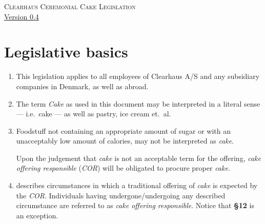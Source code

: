 \documentclass[a4paper, oneside, article]{memoir}
\newcounter{tbc}
\begin{document}
\thispagestyle{empty} %
\begin{center}
  \textsc{\huge Clearhaus Ceremonial Cake Legislation}
  \\
  {\footnotesize \href{https://semver.org/}{Version 0.4}}
\end{center}

\chapter{Legislative basics}

\begin{enumerate}[§ 1]
  \item This legislation applies to all employees of Clearhaus {\small A/S} and
    any subsidiary companies in Denmark, as well as abroad.

  \item The term \emph{Cake} as used in this document may be
    interpreted in a literal sense --- i.e.\ cake --- as well as pastry, ice
    cream et.\ al.

  \item Foodstuff not containing an appropriate amount of sugar or with an
    unacceptably low amount of calories, may not be interpreted as
    \emph{cake}.

    Upon the judgement that \emph{cake} is not an acceptable term for the
    offering, \emph{cake offering responsible} (\emph{COR}) will be obligated to 
    procure proper \emph{cake}.

  \item {} describes circumstances in which a traditional
    offering of \emph{cake} is expected by the \emph{COR}.  Individuals having 
    undergone/undergoing any described circumstance are referred to as
    \emph{cake offering responsible}. Notice that \textbf{§12} is an exception.

  \setcounter{tbc}{\value{enumi}}
\end{enumerate}
\end{document}
